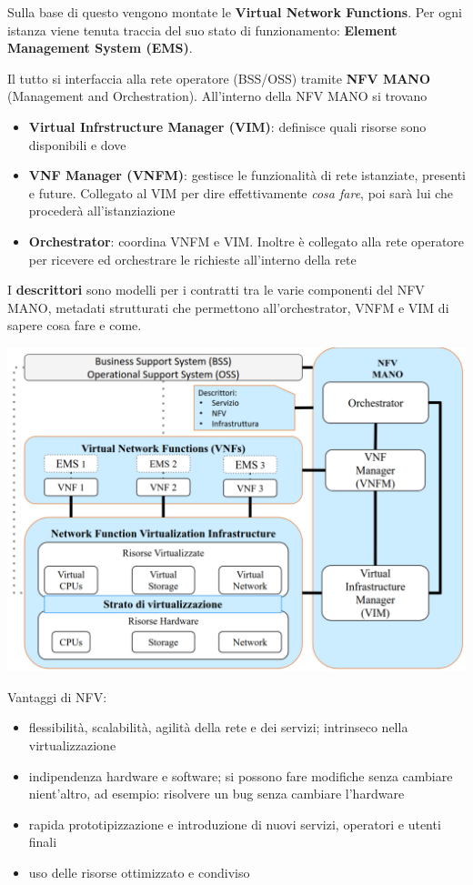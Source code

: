 Sulla base di questo vengono montate le \textbf{Virtual Network Functions}. Per ogni istanza viene tenuta traccia del suo stato di funzionamento: \textbf{Element Management System (EMS)}.

Il tutto si interfaccia alla rete operatore (BSS/OSS) tramite \textbf{NFV MANO} (Management and Orchestration). All'interno della NFV MANO si trovano
\begin{itemize}
	\item \textbf{Virtual Infrstructure Manager (VIM)}: definisce quali risorse sono disponibili e dove
    
	\item \textbf{VNF Manager (VNFM)}: gestisce le funzionalità di rete istanziate, presenti e future. Collegato al VIM per dire effettivamente \textit{cosa fare}, poi sarà lui che procederà all'istanziazione

	\item \textbf{Orchestrator}: coordina VNFM e VIM. Inoltre è collegato alla rete operatore per ricevere ed orchestrare le richieste all'interno della rete
\end{itemize}

I \textbf{descrittori} sono modelli per i contratti tra le varie componenti del NFV MANO, metadati strutturati che permettono all'orchestrator, VNFM e VIM di sapere cosa fare e come.

\begin{center}
	\includegraphics[width=0.95\linewidth]{img/5g/nfv1}
\end{center}

Vantaggi di NFV: 
\begin{itemize}
	\item flessibilità, scalabilità, agilità della rete e dei servizi; intrinseco nella virtualizzazione

	\item indipendenza hardware e software; si possono fare modifiche senza cambiare nient'altro, ad esempio: risolvere un bug senza cambiare l'hardware

	\item rapida prototipizzazione e introduzione di nuovi servizi, operatori e utenti finali

	\item uso delle risorse ottimizzato e condiviso
\end{itemize}

